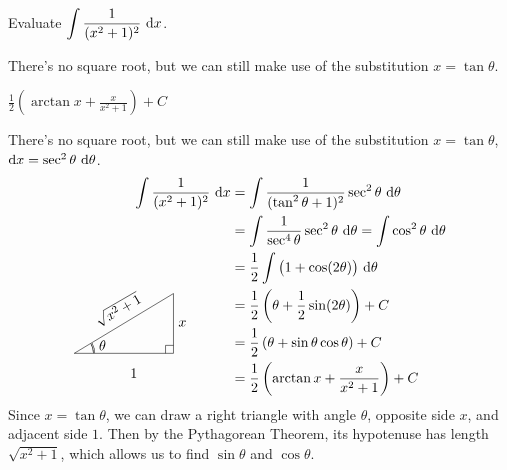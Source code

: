 \begin{Mquestion}\label{prob_s1.9:forpartialfractions} Evaluate $\displaystyle\int \frac{1}{(x^2+1)^2}~\mathrm{d}x$.
\end{Mquestion}
\begin{hint}
There's no square root, but we can still make use of the substitution $x=\tan\theta$.
\end{hint}
\begin{answer}
$\displaystyle\frac{1}{2}\left(\arctan x + \frac{x}{x^2+1}\right)+C$
\end{answer}
\begin{solution}
There's no square root, but we can still make use of the substitution $x=\tan\theta$, $\mathrm{d}x = \sec^2\theta~\mathrm{d}\theta$.
\begin{align*}
\int \frac{1}{(x^2+1)^2}~\dee{x}&=\int\frac{1}{(\tan^2\theta+1)^2}\sec^2\theta~\dee{\theta}\\
&=\int\frac{1}{\sec^4\theta}\sec^2\theta~\dee{\theta} = \int\cos^2\theta~\dee{\theta}\\
&=\frac{1}{2}\int \big(1 + \cos(2\theta)\big)~\dee{\theta}\\
&=\frac{1}{2}\left(\theta + \frac{1}{2}\sin(2\theta)\right)+C\\
&=\frac{1}{2}\left(\theta + \sin\theta\cos\theta\right)+C\\
\smash{\trigtri{\theta}{1}{x}{\sqrt{x^2+1}}}\hspace{1cm}&=\frac{1}{2}\left(\arctan x + \frac{x}{x^2+1}\right)+C
\end{align*}
Since $x = \tan\theta$, we can draw a right triangle with angle $\theta$, opposite side $x$, and adjacent side $1$. Then by the Pythagorean Theorem, its hypotenuse has length $\sqrt{x^2+1}$, which allows us to find $\sin\theta$ and $\cos\theta$.
\end{solution}


\subsection*{\Application}



